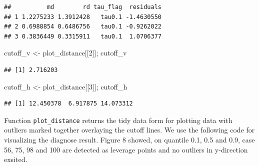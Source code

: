 \documentclass[11pt,a4paper,]{article}
\newenvironment{Shaded}{\begin{snugshade}}{\end{snugshade}}
\newcommand{\DecValTok}[1]{\textcolor[rgb]{0.00,0.00,0.81}{#1}}
\newcommand{\StringTok}[1]{\textcolor[rgb]{0.31,0.60,0.02}{#1}}
\newcommand{\NormalTok}[1]{#1}
\theoremstyle{definition}
\theoremstyle{definition}
\theoremstyle{remark}
\begin{document}
\begin{verbatim}
##          md        rd tau_flag  residuals
## 1 1.2275233 1.3912428   tau0.1 -1.4630550
## 2 0.6988854 0.6486756   tau0.1 -0.9262022
## 3 0.3836449 0.3315911   tau0.1  1.0706377
\end{verbatim}

\begin{Shaded}
\begin{Highlighting}[]
\NormalTok{cutoff_v <-}\StringTok{ }\NormalTok{plot_distance[[}\DecValTok{2}\NormalTok{]]; cutoff_v}
\end{Highlighting}
\end{Shaded}

\begin{verbatim}
## [1] 2.716203
\end{verbatim}

\begin{Shaded}
\begin{Highlighting}[]
\NormalTok{cutoff_h <-}\StringTok{ }\NormalTok{plot_distance[[}\DecValTok{3}\NormalTok{]]; cutoff_h}
\end{Highlighting}
\end{Shaded}

\begin{verbatim}
## [1] 12.450378  6.917875 14.073312
\end{verbatim}

Function \texttt{plot\_distance} returns the tidy data form for plotting
data with outliers marked together overlaying the cutoff lines. We use
the following code for visualizing the diagnose result. Figure 8 showed,
on quantile 0.1, 0.5 and 0.9, case 56, 75, 98 and 100 are detected as
leverage points and no outliers in y-direction exsited.
\end{document}
